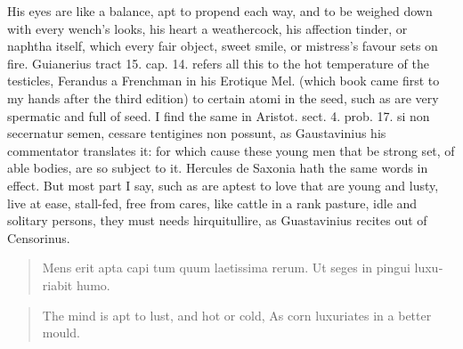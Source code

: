 His eyes are like a balance, apt to propend each way, and to be weighed
down with every wench's looks, his heart a weathercock, his affection
tinder, or naphtha itself, which every fair object, sweet smile, or
mistress's favour sets on fire. Guianerius tract 15. cap. 14. refers
all this to the hot temperature of the testicles, Ferandus a
Frenchman in his Erotique Mel. (which book came first to my hands
after the third edition) to certain atomi in the seed, such as are very
spermatic and full of seed. I find the same in Aristot. sect. 4. prob.
17. si non secernatur semen, cessare tentigines non possunt, as
Gaustavinius his commentator translates it: for which cause these young
men that be strong set, of able bodies, are so subject to it. Hercules
de Saxonia hath the same words in effect. But most part I say, such as
are aptest to love that are young and lusty, live at ease, stall-fed,
free from cares, like cattle in a rank pasture, idle and solitary
persons, they must needs hirquitullire, as Guastavinius recites out of
Censorinus.

\begin{latin}
\begin{verse}%
Mens erit apta capi tum quum laetissima rerum.
Ut seges in pingui luxuriabit humo.
\end{verse}%
\end{latin}
\translationrule%
\begin{verse}%
The mind is apt to lust, and hot or cold,
As corn luxuriates in a better mould.
\end{verse}%

